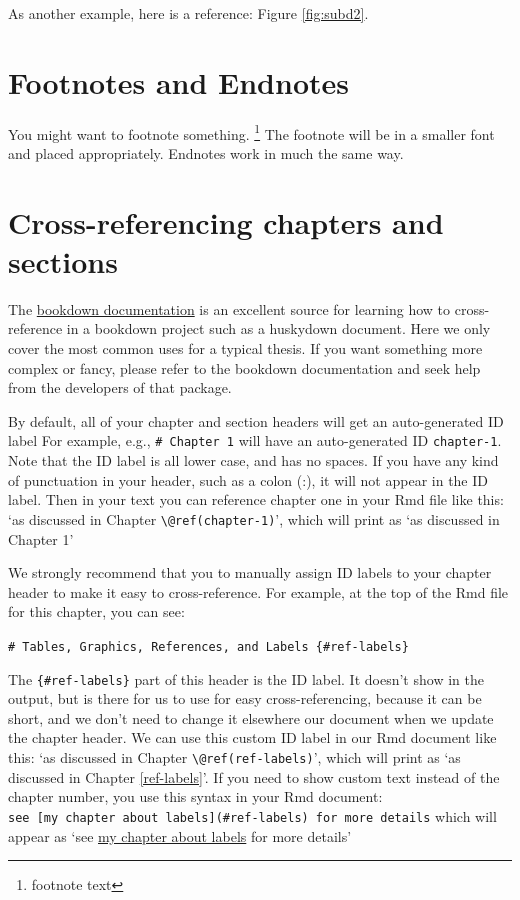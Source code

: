 \documentclass[print]{nuthesis}
\begin{document}
As another example, here is a reference: Figure \ref{fig:subd2}.

\hypertarget{footnotes-and-endnotes}{%
\section{Footnotes and Endnotes}\label{footnotes-and-endnotes}}

You might want to footnote something. \footnote{footnote text} The footnote will be in a smaller font and placed appropriately. Endnotes work in much the same way.

\hypertarget{cross-referencing-chapters-and-sections}{%
\section{Cross-referencing chapters and sections}\label{cross-referencing-chapters-and-sections}}

The \href{https://bookdown.org/yihui/bookdown/cross-references.html}{bookdown documentation} is an excellent source for learning how to cross-reference in a bookdown project such as a huskydown document. Here we only cover the most common uses for a typical thesis. If you want something more complex or fancy, please refer to the bookdown documentation and seek help from the developers of that package.

By default, all of your chapter and section headers will get an auto-generated ID label For example, e.g., \texttt{\#\ Chapter\ 1} will have an auto-generated ID \texttt{chapter-1}. Note that the ID label is all lower case, and has no spaces. If you have any kind of punctuation in your header, such as a colon (:), it will not appear in the ID label. Then in your text you can reference chapter one in your Rmd file like this: `as discussed in Chapter \texttt{\textbackslash{}@ref(chapter-1)}', which will print as `as discussed in Chapter 1'

We strongly recommend that you to manually assign ID labels to your chapter header to make it easy to cross-reference. For example, at the top of the Rmd file for this chapter, you can see:

\texttt{\#\ Tables,\ Graphics,\ References,\ and\ Labels\ \{\#ref-labels\}}

The \texttt{\{\#ref-labels\}} part of this header is the ID label. It doesn't show in the output, but is there for us to use for easy cross-referencing, because it can be short, and we don't need to change it elsewhere our document when we update the chapter header. We can use this custom ID label in our Rmd document like this: `as discussed in Chapter \texttt{\textbackslash{}@ref(ref-labels)}', which will print as `as discussed in Chapter \ref{ref-labels}'. If you need to show custom text instead of the chapter number, you use this syntax in your Rmd document: \texttt{see\ {[}my\ chapter\ about\ labels{]}(\#ref-labels)\ for\ more\ details} which will appear as `see \protect\hyperlink{ref-labels}{my chapter about labels} for more details'
\end{document}
